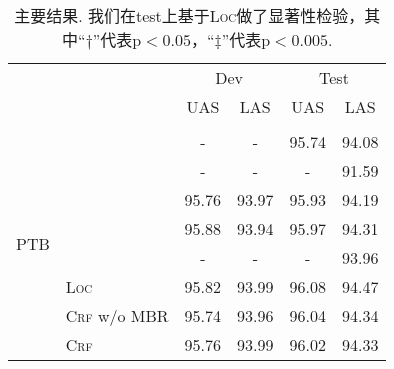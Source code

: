 \begin{table}[tb!]
	\centering
	\caption{
		主要结果.
		我们在test上基于\textsc{Loc}做了显著性检验，其中``$\dagger$''代表$\mathrm{p} < 0.05$，``$\ddagger$''代表$\mathrm{p} < 0.005$.
	}
	\begin{tabular}{llcccc}
		\toprule
		&                                   & \multicolumn{2}{c}{Dev} & \multicolumn{2}{c}{Test}                                                                       \\
		                         &                                   & UAS            & LAS            & UAS                              & LAS                              \\[2pt]
		\hline
		\\[-15pt]
		\multirow{10}{*}{PTB}    & \citet{dozat-etal-2017-biaffine}  & -              & -              & 95.74                            & 94.08                            \\
		                         & \citet{falenska-kuhn-2019-non}    & -              & -              & -                                & 91.59                            \\
		                         & \citet{li-etal-2019-attentive}    & 95.76          & 93.97          & 95.93                            & 94.19                            \\
		                         & \citet{ji-etal-2019-graph}        & 95.88          & 93.94          & 95.97                            & 94.31                            \\
		                         & \citet{zhang-etal-2019-empirical} & -              & -              & -                                & 93.96                            \\[3pt]
		                         & \textsc{Loc}                      & 95.82          & 93.99          & 96.08                            & 94.47                            \\
		                         & \textsc{Crf} w/o MBR              & 95.74          & 93.96          & 96.04                            & 94.34                            \\
		                         & \textsc{Crf}                      & 95.76          & 93.99          & 96.02                            & 94.33                            \\

\end{tabular}
\end{table}
